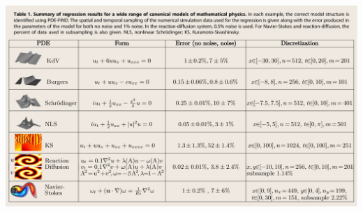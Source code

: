 \documentclass[aspectratio=169,compress,12pt,dvipsnames]{beamer}
\begin{document}
\begin{frame}
    \vfill
    \centering
    \includegraphics[width=\textwidth]{imgs/pde_find_results.png}
    \vfill
\end{frame}
\end{document}
